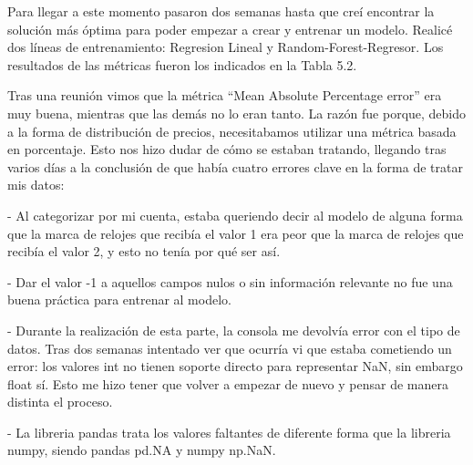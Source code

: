 	Para llegar a este momento pasaron dos semanas hasta que creí encontrar la solución más óptima para poder empezar a crear y entrenar un modelo. Realicé dos líneas de entrenamiento: Regresion Lineal y Random-Forest-Regresor. Los resultados de las métricas fueron los indicados en la Tabla 5.2.
	
	
	Tras una reunión vimos que la métrica ``Mean Absolute Percentage error'' era muy buena, mientras que las demás no lo eran tanto. La razón fue porque, debido a la forma de distribución de precios, necesitabamos utilizar una métrica basada en porcentaje. Esto nos hizo dudar de cómo se estaban tratando, llegando tras varios días a la conclusión de que había cuatro errores clave en la forma de tratar mis datos:
	
	\begin{description}
		\item - Al categorizar por mi cuenta, estaba queriendo decir al modelo de alguna forma que la marca de relojes que recibía el valor 1 era peor que la marca de relojes que recibía el valor 2, y esto no tenía por qué ser así.
		\item - Dar el valor -1 a aquellos campos nulos o sin información relevante no fue una buena práctica para entrenar al modelo.
		\item - Durante la realización de esta parte, la consola me devolvía error con el tipo de datos. Tras dos semanas intentado ver que ocurría vi que estaba cometiendo un error: los valores int no tienen soporte directo para representar NaN, sin embargo float sí. Esto me hizo tener que volver a empezar de nuevo y pensar de manera distinta el proceso.
		\item - La libreria pandas trata los valores faltantes de diferente forma que la libreria numpy, siendo pandas pd.NA y numpy np.NaN.
	\end{description}
	
